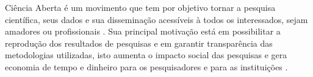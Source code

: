 Ciência Aberta é um movimento que tem por objetivo tornar a pesquisa
científica, seus dados e sua disseminação acessíveis à todos os interessados,
sejam amadores ou profissionais \cite{WikipediaOpenScience}. Sua principal
motivação está em possibilitar a reprodução dos resultados de pesquisas e em
garantir transparência das metodologias utilizadas, isto aumenta o impacto
social das pesquisas e gera economia de tempo e dinheiro para os pesquisadores
e para as instituições \cite{nesta2010open}.


%
%
%

